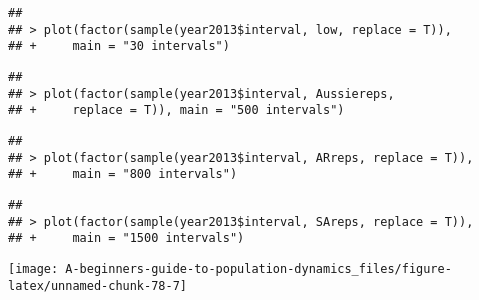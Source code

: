 \documentclass[]{book}
\begin{document}
\begin{verbatim}
## 
## > plot(factor(sample(year2013$interval, low, replace = T)), 
## +     main = "30 intervals")
\end{verbatim}

\begin{verbatim}
## 
## > plot(factor(sample(year2013$interval, Aussiereps, 
## +     replace = T)), main = "500 intervals")
\end{verbatim}

\begin{verbatim}
## 
## > plot(factor(sample(year2013$interval, ARreps, replace = T)), 
## +     main = "800 intervals")
\end{verbatim}

\begin{verbatim}
## 
## > plot(factor(sample(year2013$interval, SAreps, replace = T)), 
## +     main = "1500 intervals")
\end{verbatim}

\begin{center}\texttt{[image: A-beginners-guide-to-population-dynamics\_files/figure-latex/unnamed-chunk-78-7]} \end{center}
\end{document}
